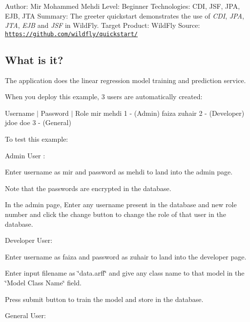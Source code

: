 Author\+: Mir Mohammed Mehdi Level\+: Beginner Technologies\+: C\+DI, J\+SF, J\+PA, E\+JB, J\+TA Summary\+: The {\ttfamily greeter} quickstart demonstrates the use of {\itshape C\+DI}, {\itshape J\+PA}, {\itshape J\+TA}, {\itshape E\+JB} and {\itshape J\+SF} in Wild\+Fly. Target Product\+: Wild\+Fly Source\+: \href{https://github.com/wildfly/quickstart/}{\tt https\+://github.\+com/wildfly/quickstart/}

\subsection*{What is it? }

The application does the linear regression model training and prediction service.

When you deploy this example, 3 users are automatically created\+:

Username $\vert$ Password $\vert$ Role mir mehdi 1 -\/ (Admin) faiza zuhair 2 -\/ (Developer) jdoe doe 3 -\/ (General)

To test this example\+:

Admin User \+:


\begin{DoxyEnumerate}
\item Enter username as \textquotesingle{}mir\textquotesingle{} and password as \textquotesingle{}mehdi\textquotesingle{} to land into the admin page.
\item Note that the passwords are encrypted in the database.
\item In the admin page, Enter any username present in the database and new role number and click the change button to change the role of that user in the database.
\end{DoxyEnumerate}

Developer User\+:


\begin{DoxyEnumerate}
\item Enter username as \textquotesingle{}faiza\textquotesingle{} and password as \textquotesingle{}zuhair\textquotesingle{} to land into the developer page.
\item Enter input filename as \char`\"{}data.\+arff\char`\"{} and give any class name to that model in the \char`\"{}\+Model Class Name\char`\"{} field.
\item Press submit button to train the model and store in the database.
\end{DoxyEnumerate}

General User\+:



